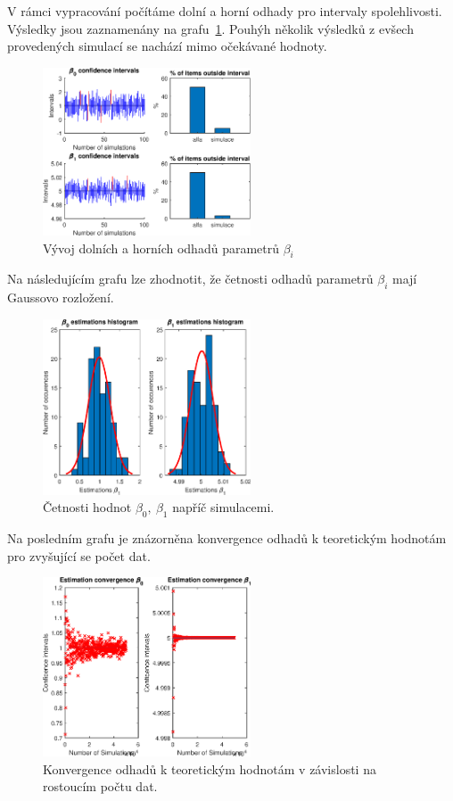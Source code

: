 V rámci vypracování počítáme dolní a horní odhady pro intervaly spolehlivosti.
Výsledky jsou zaznamenány na grafu~\ref{fig:lr1}.
Pouhýh několik výsledků z evšech provedených simulací se nachází mimo očekávané hodnoty.

\begin{figure}[htb]
    \centering
    \includegraphics[width=0.55\textwidth]{graphs/fig1.eps}
    \caption{Vývoj dolních a horních odhadů parametrů \( \beta_i \)}
    \label{fig:lr1}
\end{figure}
\FloatBarrier

Na následujícím grafu lze zhodnotit, že četnosti odhadů parametrů \( \beta_i \) mají Gaussovo rozložení.

\begin{figure}[htb]
    \centering
    \includegraphics[width=0.55\textwidth]{graphs/fig2.eps}
    \caption{Četnosti hodnot \( \beta_0, \: \beta_1 \) napříč simulacemi.}
    \label{fig:lr2}
\end{figure}
\FloatBarrier

Na posledním grafu je znázorněna konvergence odhadů k teoretickým hodnotám pro zvyšující se počet dat.

\begin{figure}[htb]
    \centering
    \includegraphics[width=0.55\textwidth]{graphs/fig3.eps}
    \caption{Konvergence odhadů k teoretickým hodnotám v závislosti na rostoucím počtu dat.}
    \label{fig:lr3}
\end{figure}
\FloatBarrier


